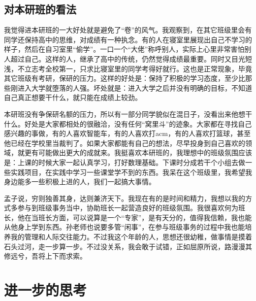 \documentclass{article}
\begin{document}
\subsection{对本研班的看法}
我觉得进本研班的一大好处就是避免了“卷”的风气。我观察到，在其它班级里会有同学还保持高中的思维，对成绩有一种执念。有的人在寝室里展现出自己不学习的样子，然后在自习室里“偷学”。一口一个“大佬”称呼别人，实际上心里非常害怕别人超过自己。这样的人，继承了高中的传统，仍然觉得成绩最重要。同时又目光短浅，不立志考全校第一，只求比寝室里的同学考得好就行。这也是正常现象，毕竟其它班级有考研，保研的压力。这样的好处是：保持了积极的学习态度，至少比那些刚进入大学就堕落的人强。坏处就是：进入大学之后并没有明确的目标，不知道自己真正想要干什么，就只能在成绩上较劲。\par 
本研班没有争保研名额的压力，所以有一部分同学貌似在混日子，没看出来他想干什么。好处是大家都相处的很融洽，没有任何“窝里斗”的迹象。大家都在寻找自己感兴趣的事做，有的人喜欢智能车，有的人喜欢打acm，有的人喜欢打篮球，甚至他已经在学校里当裁判了。如果大家都能有自己的想法，尽早投身到自己喜欢的领域，就更有可能做出更大的成就来。我挺喜欢本研班的，我理想中的班级氛围应该是：上课的时候大家一起认真学习，打好数理基础。下课时分成若干个小组去做一些实践项目，在实践中学习一些课堂学不到的东西。我呆在这个班级里，我希望我身边能多一些积极上进的人，我们一起搞大事情。\par 
孟子说，穷则独善其身，达则兼济天下。我现在有的是时间和精力，我想以我的方式多参与到班级事务当中，协助班长一起营造良好的班级氛围。我很喜欢何为班长，他在当班长方面，可以说算是一个“专家”，是有天分的，值得我信赖，我也能从他身上学到东西。孙老师也说要多管“闲事”，在参与班级事务的过程中我也能培养我的管理和人际交往能力。不过我这个年龄的人，思想还很幼稚，做事情是摸着石头过河，走一步算一步。不过没关系，我会敢于试错，正如屈原所说，路漫漫其修远兮，吾将上下而求索。\par 

\section{进一步的思考}
\end{document}
